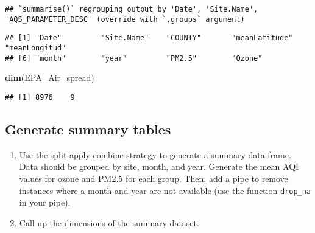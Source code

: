 \documentclass[
]{article}
\newenvironment{Shaded}{\begin{snugshade}}{\end{snugshade}}
\newcommand{\CommentTok}[1]{\textcolor[rgb]{0.56,0.35,0.01}{\textit{#1}}}
\newcommand{\DataTypeTok}[1]{\textcolor[rgb]{0.13,0.29,0.53}{#1}}
\newcommand{\KeywordTok}[1]{\textcolor[rgb]{0.13,0.29,0.53}{\textbf{#1}}}
\newcommand{\NormalTok}[1]{#1}
\newcommand{\OtherTok}[1]{\textcolor[rgb]{0.56,0.35,0.01}{#1}}
\newcommand{\StringTok}[1]{\textcolor[rgb]{0.31,0.60,0.02}{#1}}
\begin{document}
\begin{verbatim}
## `summarise()` regrouping output by 'Date', 'Site.Name', 'AQS_PARAMETER_DESC' (override with `.groups` argument)
\end{verbatim}

\begin{Shaded}
\end{Shaded}

\begin{verbatim}
## [1] "Date"         "Site.Name"    "COUNTY"       "meanLatitude" "meanLongitud"
## [6] "month"        "year"         "PM2.5"        "Ozone"
\end{verbatim}

\begin{Shaded}
\begin{Highlighting}[]
\KeywordTok{dim}\NormalTok{(EPA_Air_spread)}
\end{Highlighting}
\end{Shaded}

\begin{verbatim}
## [1] 8976    9
\end{verbatim}

\begin{Shaded}
\end{Shaded}

\hypertarget{generate-summary-tables}{%
\subsection{Generate summary tables}\label{generate-summary-tables}}

\begin{enumerate}
\def\labelenumi{\arabic{enumi}.}
\setcounter{enumi}{11}
\item
  Use the split-apply-combine strategy to generate a summary data frame.
  Data should be grouped by site, month, and year. Generate the mean AQI
  values for ozone and PM2.5 for each group. Then, add a pipe to remove
  instances where a month and year are not available (use the function
  \texttt{drop\_na} in your pipe).
\item
  Call up the dimensions of the summary dataset.
\end{enumerate}
\end{document}
